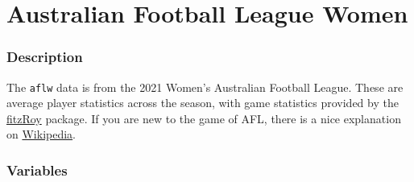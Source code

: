 \documentclass[
  letterpaper,
]{krantz}
\begin{document}
\section{Australian Football League
Women}\label{australian-football-league-women}

\subsubsection*{Description}\label{description}

The \texttt{aflw} data is from the 2021 Women's Australian Football
League. These are average player statistics across the season, with game
statistics provided by the
\href{https://jimmyday12.github.io/fitzRoy/}{fitzRoy} package. If you
are new to the game of AFL, there is a nice explanation on
\href{https://en.wikipedia.org/wiki/Women\%27s_Australian_rules_football}{Wikipedia}.

\subsubsection*{Variables}\label{variables}
\end{document}
